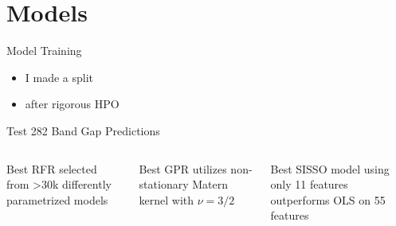 \documentclass[10pt, aspectratio=169, presentation]{beamer}
\begin{document}
\section{Models}
\label{sec:orge1ffd8a}
\begin{frame}[label={sec:org5b333cf}]{Model Training}
\begin{itemize}
\item I made a split
\item after rigorous HPO\autocite{manganaris-2022-mrs-comput}
\end{itemize}
\end{frame}

\begin{frame}[label={sec:org25c885c}]{Test 282 Band Gap Predictions}
 
\begin{center}

\end{center}

\begin{columns}
\begin{column}{0.3\columnwidth}
Best RFR selected from >30k differently parametrized models
\end{column}

\begin{column}{0.3\columnwidth}
Best GPR utilizes non-stationary Matern kernel with \(\nu=3\slash{}2\)
\end{column}

\begin{column}{0.3\columnwidth}
Best SISSO model using only 11 features outperforms OLS on 55 features
\end{column}
\end{columns}
\end{frame}
\end{document}
